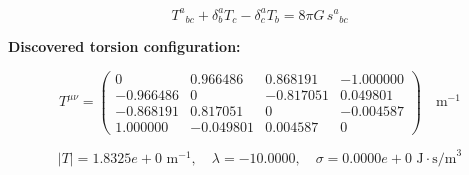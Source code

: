 
\begin{equation}
  T^a{}_{bc} + \delta^a_b T_c - \delta^a_c T_b = 8\pi G \, s^a{}_{bc}
\end{equation}

\textbf{Discovered torsion configuration:}

\begin{equation}
  T^{\mu\nu} = \begin{pmatrix}
    0 & 0.966486 & 0.868191 & -1.000000 \\
    -0.966486 & 0 & -0.817051 & 0.049801 \\
    -0.868191 & 0.817051 & 0 & -0.004587 \\
    1.000000 & -0.049801 & 0.004587 & 0
  \end{pmatrix} \quad \text{m}^{-1}
\end{equation}

\begin{equation}
  |T| = 1.8325e+0 \text{ m}^{-1}, \quad
  \lambda = -10.0000, \quad
  \sigma = 0.0000e+0 \text{ J}\cdot\text{s/m}^3
\end{equation}